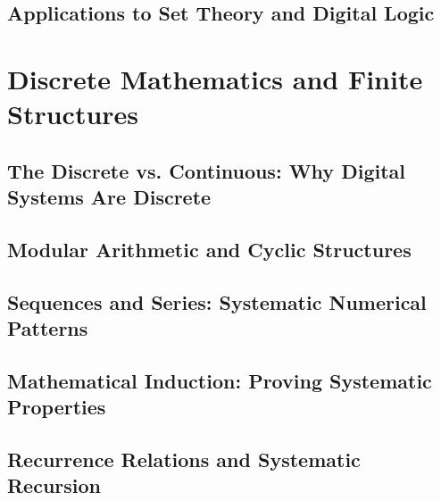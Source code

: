 \documentclass[12pt, oneside, openany]{book}
\let\oldchapter\chapter
\renewcommand{\chapter}{
	\cleardoublepage
	\thispagestyle{chapter}
	\oldchapter
}
\begin{document}
\section{Applications to Set Theory and Digital Logic}


\chapter{Discrete Mathematics and Finite Structures}

\section{The Discrete vs. Continuous: Why Digital Systems Are Discrete}

\section{Modular Arithmetic and Cyclic Structures}

\section{Sequences and Series: Systematic Numerical Patterns}

\section{Mathematical Induction: Proving Systematic Properties}

\section{Recurrence Relations and Systematic Recursion}
\end{document}
